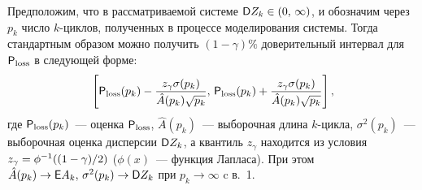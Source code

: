 \begin{multicols}{2}
Предположим, что в рассматриваемой сис\-те\-ме $\D Z_k\hm\in(0,\,\infty)$, и обозначим
через~$p_k$ чис\-ло  $k$-цик\-лов, полученных в процессе моделирования сис\-те\-мы.
Тогда стандартным образом можно получить $(1-\gamma)\%$ доверительный интервал
для ${\sf P}_{\mathrm{loss}}$ в следующей форме: 
\begin{equation}
\hspace*{-1pt}\left[{\sf P}_{\mathrm{loss}}(p_k)-\displaystyle\frac{\displaystyle z_{\gamma}\sigma(p_k)\mathstrut}{\displaystyle \hat{A}(p_k)\sqrt{p_k}\mathstrut},
\,{\sf P}_{\mathrm{loss}}(p_k)+\displaystyle\frac{\displaystyle z_{\gamma}\sigma(p_k)\mathstrut}{\displaystyle \hat{A}(p_k)\sqrt{p_k}\mathstrut}\right],\!\!
\label{e9-mn}
\end{equation}
 где ${\sf P}_{\mathrm{loss}}(p_k)$~--- оценка ${\sf P}_{\mathrm{loss}}$, $\hat{A}(p_k)$~---
выборочная длина $k$-цик\-ла, $\sigma^2(p_k)$~--- выборочная оценка дисперсии
${\sf D} Z_k$, а квантиль $z_{\gamma}$ находится из условия $z_{\gamma}\hm=\phi ^{-1}((1-\gamma)/2)$ 
($\phi(x)$~--- функция Лапласа). При этом $\hat{A}(p_k)\hm\to \e A_k,\,\sigma^2(p_k)\to \D Z_k$ 
при $p_k\to \infty$ c в.~1.


\end{multicols}
